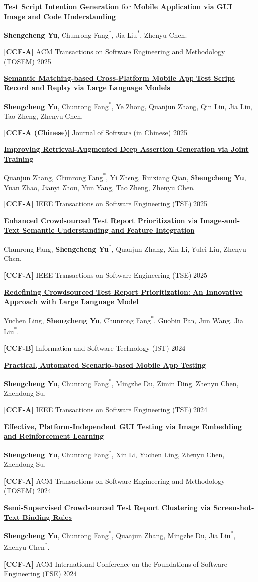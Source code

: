 \documentclass[12pt,a4paper]{article}
\newcommand{\me}{\textbf{Shengcheng Yu}}
\newcommand{\corr}{\textsuperscript{*}}
\newcommand{\ccf}[1]{\textbf{[#1]}}
\newcommand{\publication}[5]{%
  \begin{samepage}%
  \href{#5}{\textbf{\uline{#1}}}#2\par\nopagebreak[4]
  #3.\par\nopagebreak[4]
  #4\par
  \end{samepage}%
  \vspace{4.8pt}%
}
\begin{document}
\publication
{Test Script Intention Generation for Mobile Application via GUI Image and Code Understanding}
{}
{\me, Chunrong Fang\corr, Jia Liu\corr, Zhenyu Chen}
{\ccf{CCF-A} ACM Transactions on Software Engineering and Methodology (TOSEM) 2025}
{https://doi.org/10.1145/3722105}

\publication
{Semantic Matching-based Cross-Platform Mobile App Test Script Record and Replay via Large Language Models}
{}
{\me, Chunrong Fang\corr, Ye Zhong, Quanjun Zhang, Qin Liu, Jia Liu, Tao Zheng, Zhenyu Chen}
{\ccf{CCF-A (Chinese)} Journal of Software (in Chinese) 2025}
{https://www.jos.org.cn/jos/article/abstract/7414}

\publication
{Improving Retrieval-Augmented Deep Assertion Generation via Joint Training}
{}
{Quanjun Zhang, Chunrong Fang\corr, Yi Zheng, Ruixiang Qian, \me, Yuan Zhao, Jianyi Zhou, Yun Yang, Tao Zheng, Zhenyu Chen}
{\ccf{CCF-A} IEEE Transactions on Software Engineering (TSE) 2025}
{https://doi.org/10.1109/TSE.2025.3545970}

\publication
{Enhanced Crowdsourced Test Report Prioritization via Image-and-Text Semantic Understanding and Feature Integration}
{}
{Chunrong Fang, \me\corr, Quanjun Zhang, Xin Li, Yulei Liu, Zhenyu Chen}
{\ccf{CCF-A} IEEE Transactions on Software Engineering (TSE) 2025}
{https://doi.org/10.1109/TSE.2024.3516372}

\publication
{Redefining Crowdsourced Test Report Prioritization: An Innovative Approach with Large Language Model}
{}
{Yuchen Ling, \me, Chunrong Fang\corr, Guobin Pan, Jun Wang, Jia Liu\corr}
{\ccf{CCF-B} Information and Software Technology (IST) 2024}
{https://doi.org/10.1016/j.infsof.2024.107629}

\publication
{Practical, Automated Scenario-based Mobile App Testing}
{}
{\me, Chunrong Fang\corr, Mingzhe Du, Zimin Ding, Zhenyu Chen, Zhendong Su}
{\ccf{CCF-A} IEEE Transactions on Software Engineering (TSE) 2024}
{https://doi.org/10.1109/TSE.2024.3414672}

\publication
{Effective, Platform-Independent GUI Testing via Image Embedding and Reinforcement Learning}
{}
{\me, Chunrong Fang\corr, Xin Li, Yuchen Ling, Zhenyu Chen, Zhendong Su}
{\ccf{CCF-A} ACM Transactions on Software Engineering and Methodology (TOSEM) 2024}
{https://doi.org/10.1145/3674728}

\publication
{Semi-Supervised Crowdsourced Test Report Clustering via Screenshot-Text Binding Rules}
{}
{\me, Chunrong Fang\corr, Quanjun Zhang, Mingzhe Du, Jia Liu\corr, Zhenyu Chen\corr}
{\ccf{CCF-A} ACM International Conference on the Foundations of Software Engineering (FSE) 2024}
{https://doi.org/10.1145/3660776}
\end{document}
